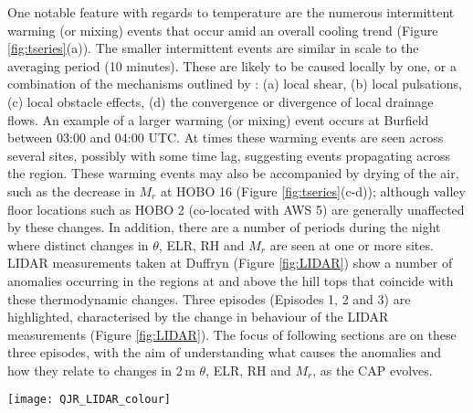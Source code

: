 \documentclass[times]{qjrms4}
\begin{document}
One notable feature with regards to temperature are the numerous intermittent warming (or mixing) events that occur amid an overall cooling trend (Figure \ref{fig:tseries}(a)). The smaller intermittent events are similar in scale to the averaging period (10 minutes). These are likely to be caused locally by one, or a combination of the mechanisms outlined by \citet{banta2004nocturnal}: (a) local shear, (b) local pulsations, (c) local obstacle effects, (d) the convergence or divergence of local drainage flows. An example of a larger warming (or mixing) event occurs at Burfield between 03:00 and 04:00 UTC. At times these warming events are seen across several sites, possibly with some time lag, suggesting events propagating across the region. These warming events may also be accompanied by drying of the air, such as the decrease in $M_r$ at HOBO 16 (Figure \ref{fig:tseries}(c-d)); although valley floor locations such as HOBO 2 (co-located with AWS 5) are generally unaffected by these changes. In addition, there are a number of periods during the night where distinct changes in $\theta$, ELR, RH and $M_r$ are seen at one or more sites. LIDAR measurements taken at Duffryn (Figure \ref{fig:LIDAR}) show a number of anomalies occurring in the regions at and above the hill tops that coincide with these thermodynamic changes. Three episodes (Episodes 1, 2 and 3) are highlighted, characterised by the change in behaviour of the LIDAR measurements (Figure \ref{fig:LIDAR}). The focus of following sections are on these three episodes, with the aim of understanding what causes the anomalies and how they relate to changes in 2$\,\mbox{m}$ $\theta$, ELR, RH and $M_r$, as the CAP evolves.
       \begin{figure*}
        \centering
        \texttt{[image: QJR\_LIDAR\_colour]}
        \caption{Time series of NCAS LIDAR measurements taken at Duffryn showing vertical profiles of vertical velocity and backscatter. The vertical dashed lines indicate local sunrise.}
	\label{fig:LIDAR}
        \end{figure*}

%
\end{document}
